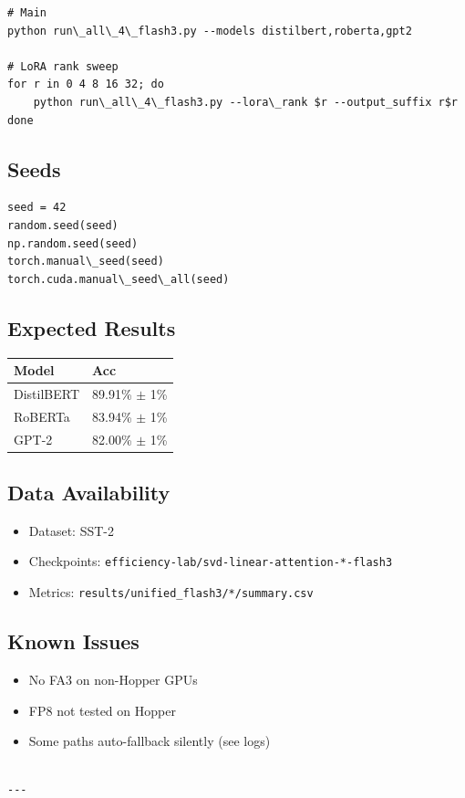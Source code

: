 \begin{lstlisting}
# Main
python run\_all\_4\_flash3.py --models distilbert,roberta,gpt2

# LoRA rank sweep
for r in 0 4 8 16 32; do
    python run\_all\_4\_flash3.py --lora\_rank $r --output_suffix r$r
done
\end{lstlisting}

\subsection{Seeds}

\begin{lstlisting}
seed = 42
random.seed(seed)
np.random.seed(seed)
torch.manual\_seed(seed)
torch.cuda.manual\_seed\_all(seed)
\end{lstlisting}

\subsection{Expected Results}

\begin{table}[H]
\centering
\small
\begin{tabular}{ll}
\toprule
\textbf{Model} & \textbf{Acc} \\
\midrule
DistilBERT & 89.91\% $\pm$ 1\% \\
RoBERTa & 83.94\% $\pm$ 1\% \\
GPT-2 & 82.00\% $\pm$ 1\% \\
\bottomrule
\end{tabular}
\end{table}

\subsection{Data Availability}

\begin{itemize}
\item Dataset: SST-2
\item Checkpoints: \texttt{efficiency-lab/svd-linear-attention-*-flash3}
\item Metrics: \texttt{results/unified\_flash3/*/summary.csv}

\end{itemize}
\subsection{Known Issues}

\begin{itemize}
\item No FA3 on non-Hopper GPUs
\item FP8 not tested on Hopper
\item Some paths auto-fallback silently (see logs)
\end{itemize}
\begin{lstlisting}

---
\end{lstlisting}